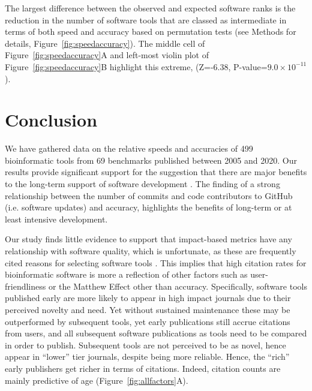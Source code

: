 \documentclass{bmcart}
\def\numTools{499}
\def\numBenchmarkPubs{69}
\begin{document}
The largest difference between the observed and expected software ranks is the reduction in the number of software tools that are
classed as intermediate in terms of both speed and accuracy based on
permutation tests (see Methods for details, Figure~\ref{fig:speedaccuracy}). The middle cell
of Figure~\ref{fig:speedaccuracy}A and left-most violin plot of Figure~\ref{fig:speedaccuracy}B highlight this extreme, (Z=-6.38,
P-value=$9.0\times 10^{-11}$). 

\section*{Conclusion}

We have gathered data on the relative speeds and accuracies of
{\color{black}\numTools~} bioinformatic tools from
{\color{black}\numBenchmarkPubs} benchmarks published between
2005 and 2020. Our results provide significant support for the suggestion that there are major benefits to
the long-term support of software development \cite{siepel2019challenges}.
The
finding of a strong relationship between the number of commits and code contributors to
GitHub (i.e. software updates) and accuracy, highlights the benefits of
long-term or at least intensive development.

Our study finds little evidence to support that impact-based metrics
have any relationship with software quality, which is unfortunate, as these
are frequently cited reasons for selecting software tools
\cite{Loman2015-bw}. This implies that high citation
rates for bioinformatic software
\cite{Perez-Iratxeta2007-lv,Van_Noorden2014-kc,Wren2016-xy} is more a
reflection of other factors such as user-friendliness or the Matthew Effect
\cite{Lariviere2010-kx,Merton1968-cb} other than accuracy.
     {\color{red} Specifically, software tools published early are
       more likely to appear in high impact journals due to their
       perceived novelty and need. Yet without sustained maintenance
       these may be outperformed by subsequent tools, yet early
       publications still accrue citations from users, and all
       subsequent software publications as tools need to be compared
       in order to publish. Subsequent tools are not perceived to be
       as novel, hence appear in ``lower'' tier journals, despite
       being more reliable. Hence, the ``rich'' early publishers get
       richer in terms of citations. Indeed, citation counts are
       mainly predictive of age (Figure~\ref{fig:allfactors}A).}
\end{document}
